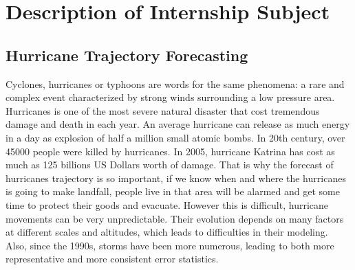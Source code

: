 \chapter{Description of Internship Subject}
\label{sec:chapter2}

\section{Hurricane Trajectory Forecasting}
\label{sec:chapter2_1}
Cyclones, hurricanes or typhoons are words for the same phenomena: a rare and complex event characterized by strong winds surrounding a low pressure area. Hurricanes is one of the most severe natural disaster that cost tremendous damage and death in each year. An average hurricane can release as much energy in a day as explosion of half a million small atomic bombs. In 20th century, over 45000 people were killed by hurricanes. In 2005, hurricane Katrina has cost as much as 125 billions US Dollars worth of damage. That is why the forecast of hurricanes trajectory is so important, if we know when and where the hurricanes is going to make landfall, people live in that area will be alarmed and get some time to protect their goods and evacuate. However this is difficult, hurricane movements can be very unpredictable. Their evolution depends on many factors at different scales and altitudes, which leads to difficulties in their modeling. Also, since the 1990s, storms have been more numerous, leading to both more representative and more consistent error statistics. 

